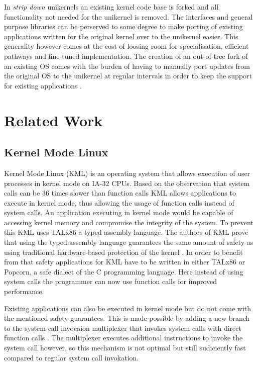 \documentclass[10pt,twocolumn,a4paper]{article}
\begin{document}
      In \textit{strip down} unikernels an existing kernel code base is forked
      and all functionality not needed for the unikernel is removed.
      The interfaces and general purpose libraries can be perserved to some degree
      to make porting of existing applications written for the original kernel
      over to the unikernel easier. 
      This generality however comes at the cost of loosing room for specialisation,
      efficient pathways and fine-tuned implementation.
      The creation of an out-of-tree fork of an existing OS comes with the burden of
      having to manually port updates from the original OS to the unikernel at regular intervals
      in order to keep the support for existing applications \cite{raza19}.
      
\section{Related Work}\label{sec:relwork} 
  \subsection{Kernel Mode Linux}
    Kernel Mode Linux (KML) is an operating system that allows
    execution of user processes in kernel mode on IA-32 CPUs.
    Based on the observation that system calls can be 36 times slower
    than function calls \cite{maeda2003} KML allows applications to execute in
    kernel mode, thus allowing the usage of function calls instead of system calls.
    An application executing in kernel mode would be capable of accessing kernel
    memory and compromise the integrity of the system.
    To prevent this KML uses TALx86 a typed assembly language.
    The authors of KML prove that using the typed assembly language guarantees the 
    same amount of safety as using traditional hardware-based protection of the kernel \cite{maeda2003}.
    In order to benefit from that safety applications for KML have to be written in
    either TALx86 or Popcorn, a safe dialect of the C programming language.
    Here instead of using system calls the programmer can now use function calls for improved performance.

    Existing applications can also be executed in kernel mode but do not come with
    the mentioned safety guarantees.
    This is made possible by adding a new branch to the system call invocaion multiplexer
    that invokes system calls with direct function calls \cite{maeda2003}.
    The multiplexer executes additional instructions to invoke the system call however, 
    so this mechanism is not optimal but still sudiciently fast compared to regular system call
    invokation.
\end{document}
